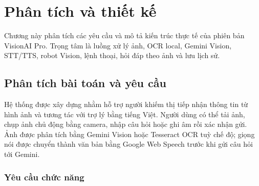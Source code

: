 \chapter{Phân tích và thiết kế}
\label{ch:thietke}

\begin{muctieu}
Chương này phân tích các yêu cầu và mô tả kiến trúc thực tế của phiên bản
VisionAI Pro. Trọng tâm là luồng xử lý ảnh, OCR local, Gemini Vision,
STT/TTS, robot Vision, lệnh thoại, hỏi đáp theo ảnh và lưu lịch sử.
\end{muctieu}

\section{Phân tích bài toán và yêu cầu}

Hệ thống được xây dựng nhằm hỗ trợ người khiếm thị tiếp nhận thông tin từ
hình ảnh và tương tác với trợ lý bằng tiếng Việt. Người dùng có thể tải ảnh,
chụp ảnh chủ động bằng camera, nhập câu hỏi hoặc ghi âm rồi xác nhận gửi.
Ảnh được phân tích bằng Gemini Vision hoặc Tesseract OCR tuỳ chế độ; giọng nói
được chuyển thành văn bản bằng Google Web Speech trước khi gửi câu hỏi tới Gemini.

\subsection{Yêu cầu chức năng}

